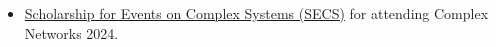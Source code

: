 \begin{itemize}[noitemsep, leftmargin=*]
  \item \href{https://yrcss.cssociety.org/grants/secs/}{Scholarship for Events on Complex Systems (SECS)} for attending Complex Networks 2024.
\end{itemize}
